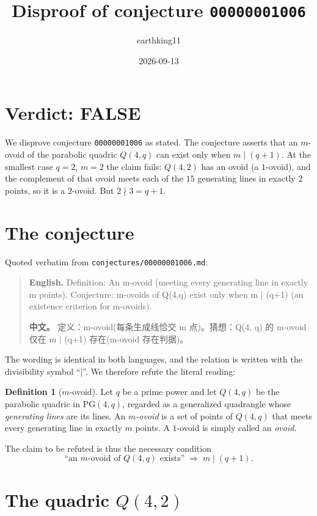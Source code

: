 \documentclass[11pt]{article}
\title{Disproof of conjecture \texttt{00000001006}}
\author{earthking11}
\date{2026-09-13}
\theoremstyle{definition}
\newtheorem{definition}[theorem]{Definition}
\theoremstyle{remark}
\newcommand{\PG}{\mathrm{PG}}
\begin{document}
\maketitle

\section*{Verdict: FALSE}

We disprove conjecture \texttt{00000001006} as stated. The conjecture asserts
that an $m$-ovoid of the parabolic quadric $Q(4,q)$ can exist only when
$m \mid (q+1)$. At the smallest case $q=2$, $m=2$ the claim fails: $Q(4,2)$ has
an ovoid (a $1$-ovoid), and the complement of that ovoid meets each of the
$15$ generating lines in exactly $2$ points, so it is a $2$-ovoid. But
$2 \nmid 3 = q+1$.

\section{The conjecture}

Quoted verbatim from \texttt{conjectures/00000001006.md}:

\begin{quote}
\textbf{English.} Definition: An m-ovoid (meeting every generating line in
exactly m points). Conjecture: m-ovoids of Q(4,q) exist only when
m $\mid$ (q+1) (an existence criterion for m-ovoids).

\textbf{中文。} 定义：m-ovoid(每条生成线恰交 m 点)。猜想：Q(4, q) 的
m-ovoid 仅在 m $\mid$ (q+1) 存在(m-ovoid 存在判据)。
\end{quote}

The wording is identical in both languages, and the relation is written with the
divisibility symbol ``$\mid$''. We therefore refute the literal reading:

\begin{definition}[$m$-ovoid]\label{def:m-ovoid}
Let $q$ be a prime power and let $Q(4,q)$ be the parabolic quadric in
$\PG(4,q)$, regarded as a generalized quadrangle whose \emph{generating lines}
are its lines. An \emph{$m$-ovoid} is a set of points of $Q(4,q)$ that meets
every generating line in exactly $m$ points. A $1$-ovoid is simply called an
\emph{ovoid}.
\end{definition}

The claim to be refuted is thus the necessary condition
\[
\text{``an $m$-ovoid of $Q(4,q)$ exists''} \;\Longrightarrow\; m \mid (q+1).
\tag{$\ast$}
\]

\section{The quadric $Q(4,2)$}
\end{document}
